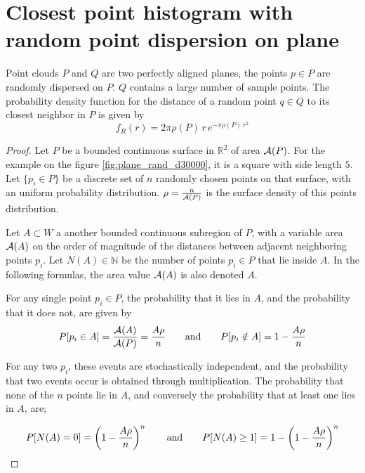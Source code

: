 \section{Closest point histogram with random point dispersion on plane} \label{sec:proof_rand_disp_plane}
Point clouds $P$ and $Q$ are two perfectly aligned planes, the points $p \in P$ are randomly dispersed on $P$. $Q$ contains a large number of sample points. The probability density function for the distance of a random point $q \in Q$ to its closest neighbor in $P$ is given by
\begin{equation}
f_R(r) = 2 \pi \rho(P) \, r \, e^{-\pi \rho(P) \, r^2}
\end{equation}

\begin{proof}
Let $P$ be a bounded continuous surface in $\mathbb{R}^2$ of area $\mathcal{A}(P)$. For the example on the figure \ref{fig:plane_rand_d30000}, it is a square with side length $5$. Let $\{ p_i \in P \}$ be a discrete set of $n$ randomly chosen points on that surface, with an uniform probability distribution. $\rho = \frac{n}{\mathcal{A}(P)}$ is the surface density of this points distribution.

Let $A \subset W$ a another bounded continuous subregion of $P$, with a variable area $\mathcal{A}(A)$ on the order of magnitude of the distances between adjacent neighboring points $p_i$. Let $N(A) \in \mathbb{N}$ be the number of points $p_i \in P$ that lie inside $A$. In the following formulas, the area value $\mathcal{A}(A)$ is also denoted $A$.

For any single point $p_i \in P$, the probability that it lies in $A$, and the probability that it does not, are given by
\begin{equation} \label{eq:rand_point_in_A}
P[p_i \in A] = \frac{\mathcal{A}(A)}{\mathcal{A}(P)} = \frac{A \rho}{n}
\hspace{7mm} \text{and} \hspace{7mm}
P[p_i \notin A] = 1 - \frac{A \rho}{n}
\end{equation}

For any two $p_i$, these events are stochastically independent, and the probability that two events occur is obtained through multiplication. The probability that none of the $n$ points lie in $A$, and conversely the probability that at least one lies in $A$, are;

\begin{equation}
P[N(A) = 0] = \left(1 - \frac{A \rho}{n}\right)^n
\hspace{7mm} \text{and} \hspace{7mm}
P[N(A) \geq 1] = 1 - \left(1 - \frac{A \rho}{n}\right)^n
\end{equation}



\end{proof}
